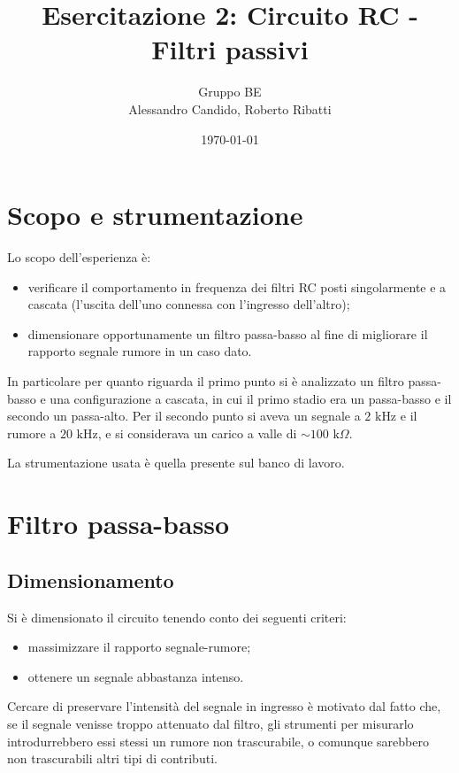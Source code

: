 \documentclass[10pt,a4paper]{article}
\title{Esercitazione 2: Circuito RC - Filtri passivi}
\author{Gruppo BE \\ Alessandro Candido, Roberto Ribatti}
\date{\today}
\newcommand\ohm{\Omega}
\newcommand\Hz{\text{Hz}}
\newcommand\K{\text{~k}}
\begin{document}
\maketitle

\section{Scopo e strumentazione}
Lo scopo dell'esperienza è:
\begin{itemize}
\item verificare il comportamento in frequenza dei filtri RC posti singolarmente e a cascata (l'uscita dell'uno connessa con l'ingresso dell'altro);
\item dimensionare opportunamente un filtro passa-basso al fine di migliorare il rapporto segnale rumore in un caso dato.
\end{itemize}

In particolare per quanto riguarda il primo punto si è analizzato un filtro passa-basso e una configurazione a cascata, in cui il primo stadio era un passa-basso e il secondo un passa-alto. Per il secondo punto si aveva un segnale a $2\K\Hz$ e il rumore a $20\K\Hz$, e si considerava un carico a valle di $\sim 100\K\ohm$.

La strumentazione usata è quella presente sul banco di lavoro.

\section{Filtro passa-basso}

\subsection{Dimensionamento}
Si è dimensionato il circuito tenendo conto dei seguenti criteri:
\begin{itemize}
\item massimizzare il rapporto segnale-rumore;
\item ottenere un segnale abbastanza intenso.
\end{itemize}
Cercare di preservare l'intensità del segnale in ingresso è motivato dal fatto che, se il segnale venisse troppo attenuato dal filtro, gli strumenti per misurarlo introdurrebbero essi stessi un rumore non trascurabile, o comunque sarebbero non trascurabili altri tipi di contributi.
\end{document}
